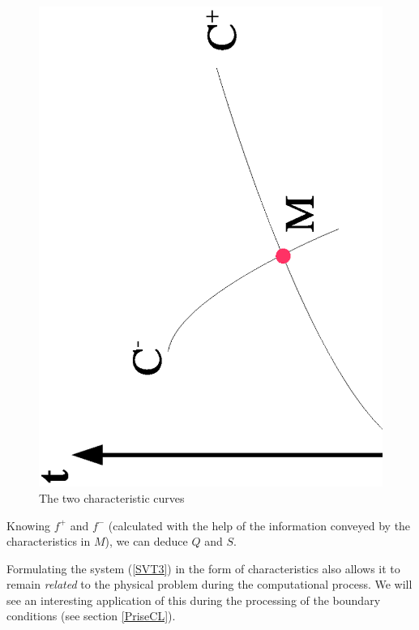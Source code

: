 \begin{figure}
 \begin{center}
  \includegraphics[scale=0.5,angle=270]{Figures/2Carac.eps} \hspace{2cm}
  \vspace{1.cm}
  \caption{The two characteristic curves}
 \end{center}
\end{figure}

Knowing $f^+$ and $f^-$ (calculated with the help of the information conveyed by the characteristics in $M$), we can deduce $Q$ and $S$.

\vspace{0.5cm}

Formulating the system (\ref{SVT3}) in the form of characteristics also allows it to remain \textit{related} to the physical problem during the computational process. We will see an interesting application of this during the processing of the boundary conditions (see section \ref{PriseCL}).

